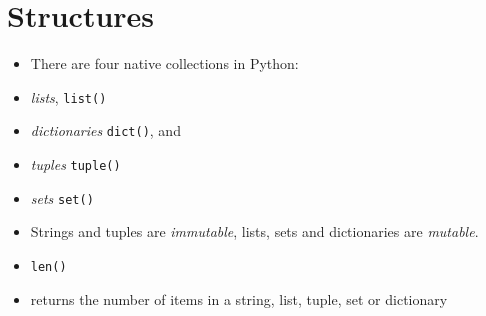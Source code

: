 \documentclass[onecolumn]{IEEEtran} %
\begin{document}
\section{Structures}
\begin{itemize}
  \item There are four native collections in Python:
  \bi
    \item \emph{lists}, \verb|list()|
    \item \emph{dictionaries} \verb|dict()|, and
    \item \emph{tuples} \verb|tuple()|
    \item \emph{sets} \verb|set()|
  \ei
  \item Strings and tuples are \emph{immutable}, lists, sets and dictionaries are \emph{mutable}.
  \item \verb|len()|
    \bi
        \item returns the number of items in a string, list, tuple, set or dictionary
    \ei
\end{itemize}
\end{document}
